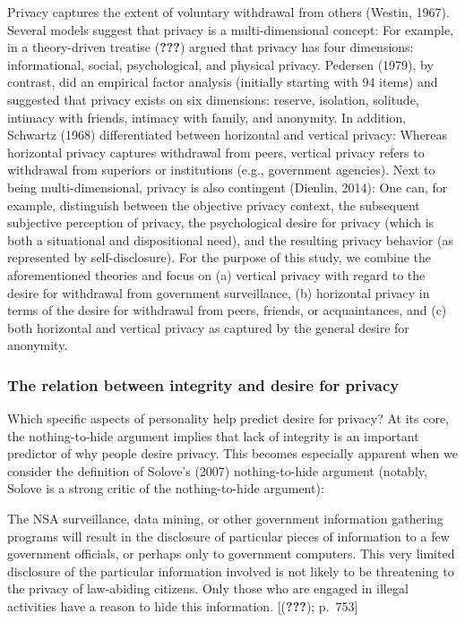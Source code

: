 \documentclass[man]{apa6}
\theoremstyle{definition}
\theoremstyle{definition}
\theoremstyle{definition}
\theoremstyle{remark}
\begin{document}
Privacy captures the extent of voluntary withdrawal from others (Westin,
1967). Several models suggest that privacy is a multi-dimensional
concept: For example, in a theory-driven treatise ({\textbf{???}})
argued that privacy has four dimensions: informational, social,
psychological, and physical privacy. Pedersen (1979), by contrast, did
an empirical factor analysis (initially starting with 94 items) and
suggested that privacy exists on six dimensions: reserve, isolation,
solitude, intimacy with friends, intimacy with family, and anonymity. In
addition, Schwartz (1968) differentiated between horizontal and vertical
privacy: Whereas horizontal privacy captures withdrawal from peers,
vertical privacy refers to withdrawal from superiors or institutions
(e.g., government agencies). Next to being multi-dimensional, privacy is
also contingent (Dienlin, 2014): One can, for example, distinguish
between the objective privacy context, the subsequent subjective
perception of privacy, the psychological desire for privacy (which is
both a situational and dispositional need), and the resulting privacy
behavior (as represented by self-disclosure). For the purpose of this
study, we combine the aforementioned theories and focus on (a) vertical
privacy with regard to the desire for withdrawal from government
surveillance, (b) horizontal privacy in terms of the desire for
withdrawal from peers, friends, or acquaintances, and (c) both
horizontal and vertical privacy as captured by the general desire for
anonymity.

\hypertarget{the-relation-between-integrity-and-desire-for-privacy}{%
\subsubsection{The relation between integrity and desire for
privacy}\label{the-relation-between-integrity-and-desire-for-privacy}}

Which specific aspects of personality help predict desire for privacy?
At its core, the nothing-to-hide argument implies that lack of integrity
is an important predictor of why people desire privacy. This becomes
especially apparent when we consider the definition of Solove's (2007)
nothing-to-hide argument (notably, Solove is a strong critic of the
nothing-to-hide argument):

The NSA surveillance, data mining, or other government information
gathering programs will result in the disclosure of particular pieces of
information to a few government officials, or perhaps only to government
computers. This very limited disclosure of the particular information
involved is not likely to be threatening to the privacy of law-abiding
citizens. Only those who are engaged in illegal activities have a reason
to hide this information. {[}({\textbf{???}}); p.~753{]}
\end{document}
